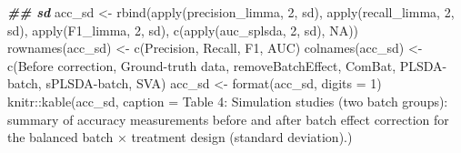 \documentclass[
]{book}
\newenvironment{Shaded}{\begin{snugshade}}{\end{snugshade}}
\newcommand{\AttributeTok}[1]{\textcolor[rgb]{0.77,0.63,0.00}{#1}}
\newcommand{\ConstantTok}[1]{\textcolor[rgb]{0.00,0.00,0.00}{#1}}
\newcommand{\DecValTok}[1]{\textcolor[rgb]{0.00,0.00,0.81}{#1}}
\newcommand{\DocumentationTok}[1]{\textcolor[rgb]{0.56,0.35,0.01}{\textbf{\textit{#1}}}}
\newcommand{\FunctionTok}[1]{\textcolor[rgb]{0.00,0.00,0.00}{#1}}
\newcommand{\NormalTok}[1]{#1}
\newcommand{\OtherTok}[1]{\textcolor[rgb]{0.56,0.35,0.01}{#1}}
\newcommand{\SpecialCharTok}[1]{\textcolor[rgb]{0.00,0.00,0.00}{#1}}
\newcommand{\StringTok}[1]{\textcolor[rgb]{0.31,0.60,0.02}{#1}}
\begin{document}
\begin{Shaded}
\begin{Highlighting}[]
\DocumentationTok{\#\# sd}
\NormalTok{acc\_sd }\OtherTok{\textless{}{-}} \FunctionTok{rbind}\NormalTok{(}\FunctionTok{apply}\NormalTok{(precision\_limma, }\DecValTok{2}\NormalTok{, sd), }\FunctionTok{apply}\NormalTok{(recall\_limma, }\DecValTok{2}\NormalTok{, sd), }
                \FunctionTok{apply}\NormalTok{(F1\_limma, }\DecValTok{2}\NormalTok{, sd), }\FunctionTok{c}\NormalTok{(}\FunctionTok{apply}\NormalTok{(auc\_splsda, }\DecValTok{2}\NormalTok{, sd), }\ConstantTok{NA}\NormalTok{))}
\FunctionTok{rownames}\NormalTok{(acc\_sd) }\OtherTok{\textless{}{-}} \FunctionTok{c}\NormalTok{(}\StringTok{\textquotesingle{}Precision\textquotesingle{}}\NormalTok{, }\StringTok{\textquotesingle{}Recall\textquotesingle{}}\NormalTok{, }\StringTok{\textquotesingle{}F1\textquotesingle{}}\NormalTok{, }\StringTok{\textquotesingle{}AUC\textquotesingle{}}\NormalTok{)}
\FunctionTok{colnames}\NormalTok{(acc\_sd) }\OtherTok{\textless{}{-}} \FunctionTok{c}\NormalTok{(}\StringTok{\textquotesingle{}Before correction\textquotesingle{}}\NormalTok{, }\StringTok{\textquotesingle{}Ground{-}truth data\textquotesingle{}}\NormalTok{, }
                      \StringTok{\textquotesingle{}removeBatchEffect\textquotesingle{}}\NormalTok{, }\StringTok{\textquotesingle{}ComBat\textquotesingle{}}\NormalTok{, }
                      \StringTok{\textquotesingle{}PLSDA{-}batch\textquotesingle{}}\NormalTok{, }\StringTok{\textquotesingle{}sPLSDA{-}batch\textquotesingle{}}\NormalTok{, }\StringTok{\textquotesingle{}SVA\textquotesingle{}}\NormalTok{)}
\NormalTok{acc\_sd }\OtherTok{\textless{}{-}} \FunctionTok{format}\NormalTok{(acc\_sd, }\AttributeTok{digits =} \DecValTok{1}\NormalTok{)}
\NormalTok{knitr}\SpecialCharTok{::}\FunctionTok{kable}\NormalTok{(acc\_sd, }\AttributeTok{caption =} \StringTok{\textquotesingle{}Table 4: Simulation studies (two batch groups): summary of accuracy measurements before and after batch effect correction for the balanced batch × treatment design (standard deviation).\textquotesingle{}}\NormalTok{)}
\end{Highlighting}
\end{Shaded}
\end{document}
